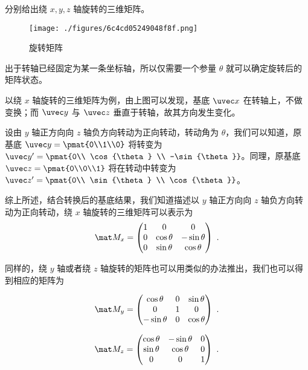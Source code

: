 \begin{example}{分别给出绕 $x,y,z$ 轴旋转的三维矩阵。}

\begin{figure}[ht]
\centering
\texttt{[image: ./figures/6c4cd05249048f8f.png]}
\caption{旋转矩阵} \label{fig_Rot3D_1}
\end{figure}

出于转轴已经固定为某一条坐标轴，所以仅需要一个参量 $\theta$ 就可以确定旋转后的矩阵状态。

以绕 $x$ 轴旋转的三维矩阵为例，由上图可以发现，基底 $\uvec x$ 在转轴上，不做变换；而 $\uvec y$ 与 $\uvec z$ 垂直于转轴，故其方向发生变化。

设由 $y$ 轴正方向向 $z$ 轴负方向转动为正向转动，转动角为 $\theta$，我们可以知道，原基底 $\uvec y=\pmat{0\\1\\0}$ 将转变为 $\uvec y'=\pmat{0\\ \cos{\theta} \\ -\sin{\theta}}$。同理，原基底 $\uvec z=\pmat{0\\0\\1}$ 将在转动中转变为 $\uvec z'=\pmat{0\\ \sin{\theta} \\ \cos{\theta}}$。

综上所述，结合转换后的基底结果，我们知道描述以 $y$ 轴正方向向 $z$ 轴负方向转动为正向转动，绕 $x$ 轴旋转的三维矩阵可以表示为
\begin{equation}
\mat M_x = \begin{pmatrix}
1 & 0 & 0 \\
0 & \cos{\theta} & -\sin{\theta} \\
0 & \sin{\theta} & \cos{\theta}
\end{pmatrix}~.\end{equation}

同样的，绕 $y$ 轴或者绕 $z$ 轴旋转的矩阵也可以用类似的办法推出，我们也可以得到相应的矩阵为

\begin{equation}
\mat M_y = \begin{pmatrix}
\cos{\theta} & 0 & \sin{\theta} \\
0 & 1 & 0 \\
-\sin{\theta} & 0 & \cos{\theta}
\end{pmatrix}~.\end{equation}

\begin{equation}
\mat M_z = \begin{pmatrix}
\cos{\theta} & -\sin{\theta} & 0 \\
\sin{\theta} & \cos{\theta} & 0 \\
0 & 0 & 1
\end{pmatrix}~.\end{equation}

\end{example}


